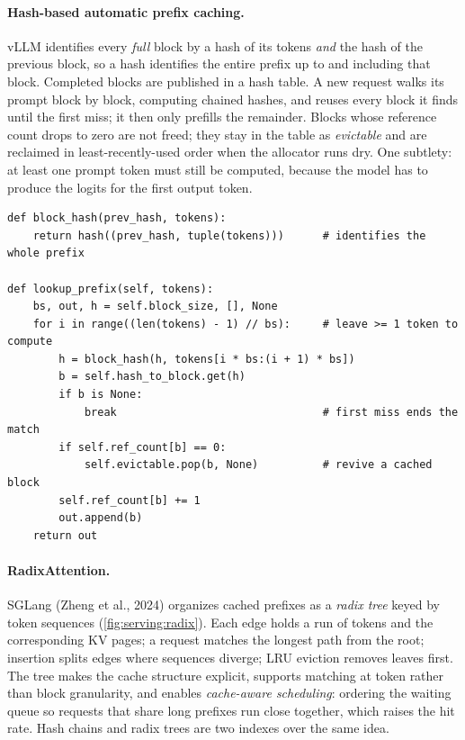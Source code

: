 \paragraph{Hash-based automatic prefix caching.} vLLM identifies every \emph{full} block by a hash of
its tokens \emph{and} the hash of the previous block, so a hash identifies the entire prefix up to and
including that block. Completed blocks are published in a hash table. A new request walks its prompt
block by block, computing chained hashes, and reuses every block it finds until the first miss; it
then only prefills the remainder. Blocks whose reference count drops to zero are not freed; they stay
in the table as \emph{evictable} and are reclaimed in least-recently-used order when the allocator runs
dry. One subtlety: at least one prompt token must still be computed, because the model has to produce
the logits for the first output token.

\begin{lstlisting}[caption={Prefix lookup with chained block hashes (llmsys.serving.block\_manager).},label={lst:serving:lookup}]
def block_hash(prev_hash, tokens):
    return hash((prev_hash, tuple(tokens)))      # identifies the whole prefix

def lookup_prefix(self, tokens):
    bs, out, h = self.block_size, [], None
    for i in range((len(tokens) - 1) // bs):     # leave >= 1 token to compute
        h = block_hash(h, tokens[i * bs:(i + 1) * bs])
        b = self.hash_to_block.get(h)
        if b is None:
            break                                # first miss ends the match
        if self.ref_count[b] == 0:
            self.evictable.pop(b, None)          # revive a cached block
        self.ref_count[b] += 1
        out.append(b)
    return out
\end{lstlisting}

\paragraph{RadixAttention.} SGLang (Zheng et al., 2024) organizes cached prefixes as a \emph{radix
tree} keyed by token sequences (\cref{fig:serving:radix}). Each edge holds a run of tokens and the
corresponding KV pages; a request matches the longest path from the root; insertion splits edges where
sequences diverge; LRU eviction removes leaves first. The tree makes the cache structure explicit,
supports matching at token rather than block granularity, and enables \emph{cache-aware scheduling}:
ordering the waiting queue so requests that share long prefixes run close together, which raises the hit
rate. Hash chains and radix trees are two indexes over the same idea.

